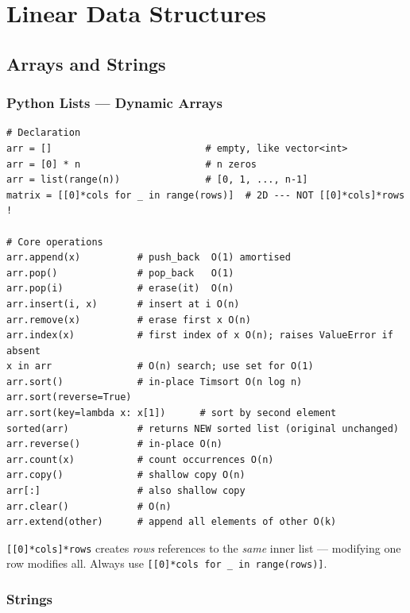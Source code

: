 \documentclass[11pt,a4paper]{report}
\begin{document}
\part{Linear Data Structures}

\chapter{Arrays and Strings}

\section{Python Lists --- Dynamic Arrays}

\begin{lstlisting}
# Declaration
arr = []                           # empty, like vector<int>
arr = [0] * n                      # n zeros
arr = list(range(n))               # [0, 1, ..., n-1]
matrix = [[0]*cols for _ in range(rows)]  # 2D --- NOT [[0]*cols]*rows !

# Core operations
arr.append(x)          # push_back  O(1) amortised
arr.pop()              # pop_back   O(1)
arr.pop(i)             # erase(it)  O(n)
arr.insert(i, x)       # insert at i O(n)
arr.remove(x)          # erase first x O(n)
arr.index(x)           # first index of x O(n); raises ValueError if absent
x in arr               # O(n) search; use set for O(1)
arr.sort()             # in-place Timsort O(n log n)
arr.sort(reverse=True)
arr.sort(key=lambda x: x[1])      # sort by second element
sorted(arr)            # returns NEW sorted list (original unchanged)
arr.reverse()          # in-place O(n)
arr.count(x)           # count occurrences O(n)
arr.copy()             # shallow copy O(n)
arr[:]                 # also shallow copy
arr.clear()            # O(n)
arr.extend(other)      # append all elements of other O(k)
\end{lstlisting}

\begin{warnbox}
\texttt{[[0]*cols]*rows} creates \emph{rows} references to the \emph{same} inner list --- modifying one row modifies all. Always use \texttt{[[0]*cols for \_ in range(rows)]}.
\end{warnbox}

\section{Strings}
\end{document}
